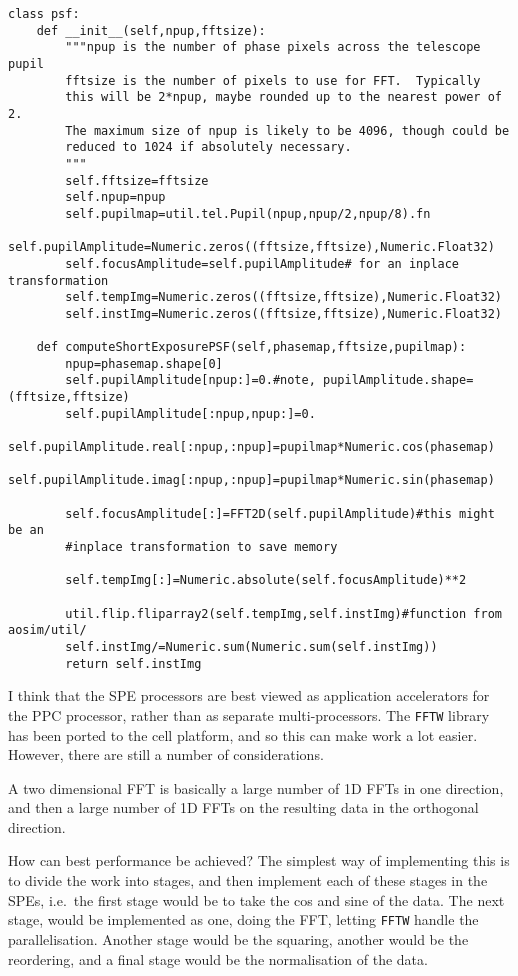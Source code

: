 \documentclass{article}
\begin{document}
\begin{verbatim}
class psf:
    def __init__(self,npup,fftsize):
        """npup is the number of phase pixels across the telescope pupil
        fftsize is the number of pixels to use for FFT.  Typically
        this will be 2*npup, maybe rounded up to the nearest power of 2.
        The maximum size of npup is likely to be 4096, though could be
        reduced to 1024 if absolutely necessary.
        """
        self.fftsize=fftsize
        self.npup=npup
        self.pupilmap=util.tel.Pupil(npup,npup/2,npup/8).fn
        self.pupilAmplitude=Numeric.zeros((fftsize,fftsize),Numeric.Float32)
        self.focusAmplitude=self.pupilAmplitude# for an inplace transformation
        self.tempImg=Numeric.zeros((fftsize,fftsize),Numeric.Float32)
        self.instImg=Numeric.zeros((fftsize,fftsize),Numeric.Float32)

    def computeShortExposurePSF(self,phasemap,fftsize,pupilmap):
        npup=phasemap.shape[0]
        self.pupilAmplitude[npup:]=0.#note, pupilAmplitude.shape=(fftsize,fftsize)
        self.pupilAmplitude[:npup,npup:]=0.
        self.pupilAmplitude.real[:npup,:npup]=pupilmap*Numeric.cos(phasemap)
        self.pupilAmplitude.imag[:npup,:npup]=pupilmap*Numeric.sin(phasemap)

        self.focusAmplitude[:]=FFT2D(self.pupilAmplitude)#this might be an
        #inplace transformation to save memory
    
        self.tempImg[:]=Numeric.absolute(self.focusAmplitude)**2

        util.flip.fliparray2(self.tempImg,self.instImg)#function from aosim/util/
        self.instImg/=Numeric.sum(Numeric.sum(self.instImg))
        return self.instImg
\end{verbatim}

I think that the SPE processors are best viewed as application
accelerators for the PPC processor, rather than as separate
multi-processors.  The \texttt{FFTW} library has been ported to the
cell platform, and so this can make work a lot easier.  However, there
are still a number of considerations.

A two dimensional FFT is basically a large number of 1D FFTs in one
direction, and then a large number of 1D FFTs on the resulting data in
the orthogonal direction.  

How can best performance be achieved?  The simplest way of
implementing this is to divide the work into stages, and then
implement each of these stages in the SPEs, i.e.\ the first stage
would be to take the cos and sine of the data.  The next stage, would
be implemented as one, doing the FFT, letting \texttt{FFTW} handle the
parallelisation.  Another stage would be the squaring, another would
be the reordering, and a final stage would be the normalisation of the
data.
\end{document}
